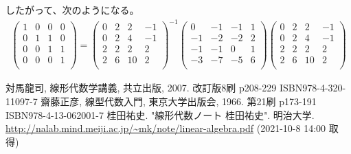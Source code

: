 \documentclass[dvipdfmx]{jsarticle}
\begin{document}
したがって、次のようになる。
\begin{align*}
\begin{pmatrix}
1 & 0 & 0 & 0 \\
0 & 1 & 1 & 0 \\
0 & 0 & 1 & 1 \\
0 & 0 & 0 & 1 \\
\end{pmatrix} = \begin{pmatrix}
0 & 2 & 2 & - 1 \\
0 & 2 & 4 & - 1 \\
2 & 2 & 2 & 2 \\
2 & 6 & 10 & 2 \\
\end{pmatrix}^{- 1}\begin{pmatrix}
0 & - 1 & - 1 & 1 \\
 - 1 & - 2 & - 2 & 2 \\
 - 1 & - 1 & 0 & 1 \\
 - 3 & - 7 & - 5 & 6 \\
\end{pmatrix}\begin{pmatrix}
0 & 2 & 2 & - 1 \\
0 & 2 & 4 & - 1 \\
2 & 2 & 2 & 2 \\
2 & 6 & 10 & 2 \\
\end{pmatrix}
\end{align*}
\begin{thebibliography}{50}
  対馬龍司, 線形代数学講義, 共立出版, 2007. 改訂版8刷 p208-229 ISBN978-4-320-11097-7
  齋藤正彦, 線型代数入門, 東京大学出版会, 1966. 第21刷 p173-191 ISBN978-4-13-062001-7
  桂田祐史. "線形代数ノート 桂田祐史". 明治大学. \url{http://nalab.mind.meiji.ac.jp/~mk/note/linear-algebra.pdf} (2021-10-8 14:00 取得)
\end{thebibliography}
\end{document}
